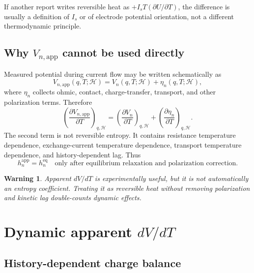 \documentclass[11pt,a4paper]{article}
\newtheorem*{warningbox}{Warning}
\newcommand{\eqs}{\mathrm{eq}}
\newcommand{\app}{\mathrm{app}}
\newcommand{\calH}{\mathcal H}
\begin{document}
If another report writes reversible heat as \(+I_sT(\partial U/\partial T)\), the difference is usually a
definition of \(I_s\) or of electrode potential orientation, not a different thermodynamic principle.

\subsection{Why \(V_{n,\app}\) cannot be used directly}\label{sec:not_app}

Measured potential during current flow may be written schematically as
\begin{equation}
V_{n,\app}(q,T;\calH)
=
V_n(q,T;\calH)+\eta_n(q,T;\calH),
\label{eq:Vapp}
\end{equation}
where \(\eta_n\) collects ohmic, contact, charge-transfer, transport, and other polarization terms. Therefore
\begin{equation}
\left(\frac{\partial V_{n,\app}}{\partial T}\right)_{q,\calH}
=
\left(\frac{\partial V_n}{\partial T}\right)_{q,\calH}
+
\left(\frac{\partial\eta_n}{\partial T}\right)_{q,\calH}.
\label{eq:app_derivative}
\end{equation}
The second term is not reversible entropy. It contains resistance temperature dependence, exchange-current
temperature dependence, transport temperature dependence, and history-dependent lag. Thus
\[
h_n^{\app}=h_n^{\eqs}
\quad\text{only after equilibrium relaxation and polarization correction.}
\]

\begin{warningbox}
Apparent \(dV/dT\) is experimentally useful, but it is not automatically an entropy coefficient. Treating it
as reversible heat without removing polarization and kinetic lag double-counts dynamic effects.
\end{warningbox}

\section{Dynamic apparent \(dV/dT\)}\label{sec:dynamic_dvdt}

\subsection{History-dependent charge balance}\label{sec:history_balance}
\end{document}

